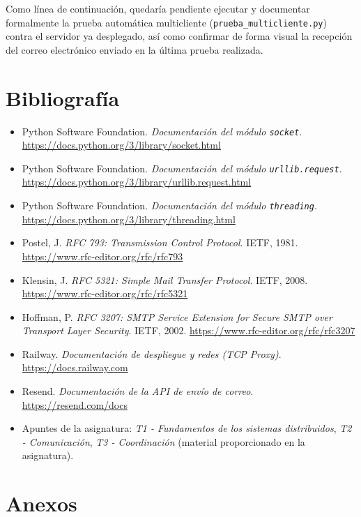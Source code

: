 \documentclass[12pt,a4paper]{article}
\begin{document}
Como línea de continuación, quedaría pendiente ejecutar y documentar formalmente la prueba automática multicliente (\texttt{prueba\_multicliente.py}) contra el servidor ya desplegado, así como confirmar de forma visual la recepción del correo electrónico enviado en la última prueba realizada.


\section{Bibliografía}

\begin{itemize}
    \item Python Software Foundation. \textit{Documentación del módulo \texttt{socket}}. \url{https://docs.python.org/3/library/socket.html}
    \item Python Software Foundation. \textit{Documentación del módulo \texttt{urllib.request}}. \url{https://docs.python.org/3/library/urllib.request.html}
    \item Python Software Foundation. \textit{Documentación del módulo \texttt{threading}}. \url{https://docs.python.org/3/library/threading.html}
    \item Postel, J. \textit{RFC 793: Transmission Control Protocol}. IETF, 1981. \url{https://www.rfc-editor.org/rfc/rfc793}
    \item Klensin, J. \textit{RFC 5321: Simple Mail Transfer Protocol}. IETF, 2008. \url{https://www.rfc-editor.org/rfc/rfc5321}
    \item Hoffman, P. \textit{RFC 3207: SMTP Service Extension for Secure SMTP over Transport Layer Security}. IETF, 2002. \url{https://www.rfc-editor.org/rfc/rfc3207}
    \item Railway. \textit{Documentación de despliegue y redes (TCP Proxy)}. \url{https://docs.railway.com}
    \item Resend. \textit{Documentación de la API de envío de correo}. \url{https://resend.com/docs}
    \item Apuntes de la asignatura: \textit{T1 - Fundamentos de los sistemas distribuidos}, \textit{T2 - Comunicación}, \textit{T3 - Coordinación} (material proporcionado en la asignatura).
\end{itemize}


\section{Anexos}
\end{document}
